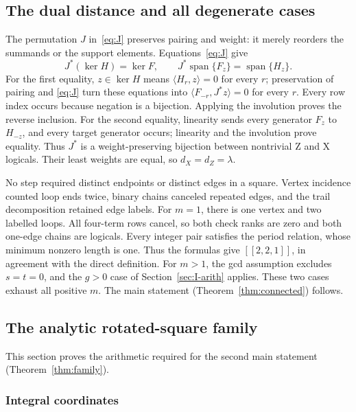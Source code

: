 \documentclass{article}
\numberwithin{equation}{section}
\begin{document}
\subsection{The dual distance and all degenerate cases}\label{sec:I-dual}

The permutation \(J\) in~\eqref{eq:J} preserves pairing and weight: it merely
reorders the summands or the support elements. Equations~\eqref{eq:J} give
\begin{equation}\label{eq:J-spaces}
  J^*(\ker H)=\ker F,\qquad
  J^*\operatorname{span}\{F_z\}=\operatorname{span}\{H_z\}.
\end{equation}
For the first equality, \(z\in\ker H\) means
\(\langle H_r,z\rangle=0\) for every \(r\); preservation of pairing and
\eqref{eq:J} turn these equations into
\(\langle F_{-r},J^*z\rangle=0\) for every \(r\). Every row index occurs
because negation is a bijection. Applying the involution proves the reverse
inclusion. For the second equality, linearity sends every generator \(F_z\)
to \(H_{-z}\), and every target generator occurs; linearity and the
involution prove equality. Thus \(J^*\) is a weight-preserving bijection
between nontrivial Z and X logicals. Their least weights are equal, so
\(d_X=d_Z=\lambda\).

No step required distinct endpoints or distinct edges in a square. Vertex
incidence counted loop ends twice, binary chains canceled repeated edges,
and the trail decomposition retained edge labels. For \(m=1\), there is
one vertex and two labelled loops. All four-term rows cancel, so both check
ranks are zero and both one-edge chains are logicals. Every integer pair
satisfies the period relation, whose minimum nonzero length is one. Thus
the formulas give \([[2,2,1]]\), in agreement with the direct definition.
For \(m>1\), the gcd assumption excludes \(s=t=0\), and the \(g>0\) case of
Section~\ref{sec:I-arith} applies. These two cases exhaust all positive \(m\). The main
statement (Theorem~\ref{thm:connected}) follows.

\subsection{The analytic rotated-square family}\label{sec:I-family}

This section proves the arithmetic required for the second main statement
(Theorem~\ref{thm:family}).

\subsubsection{Integral coordinates}\label{sec:I-coords}
\end{document}
